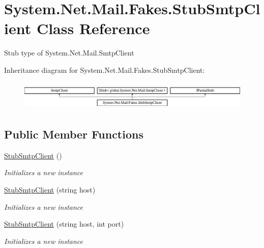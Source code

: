 \hypertarget{class_system_1_1_net_1_1_mail_1_1_fakes_1_1_stub_smtp_client}{\section{System.\-Net.\-Mail.\-Fakes.\-Stub\-Smtp\-Client Class Reference}
\label{class_system_1_1_net_1_1_mail_1_1_fakes_1_1_stub_smtp_client}
}


Stub type of System.\-Net.\-Mail.\-Smtp\-Client 


Inheritance diagram for System.\-Net.\-Mail.\-Fakes.\-Stub\-Smtp\-Client\-:\begin{figure}[H]
\begin{center}
\leavevmode
\includegraphics[height=1.414141cm]{class_system_1_1_net_1_1_mail_1_1_fakes_1_1_stub_smtp_client}
\end{center}
\end{figure}
\subsection*{Public Member Functions}
\begin{DoxyCompactItemize}
\item 
\hyperlink{class_system_1_1_net_1_1_mail_1_1_fakes_1_1_stub_smtp_client_ab43f8d3d3a91cd4d7e2cb9d6e5442d5f}{Stub\-Smtp\-Client} ()
\begin{DoxyCompactList}\small\item\em Initializes a new instance\end{DoxyCompactList}\item 
\hyperlink{class_system_1_1_net_1_1_mail_1_1_fakes_1_1_stub_smtp_client_a39647712ad5599473fa9374e92df0bb5}{Stub\-Smtp\-Client} (string host)
\begin{DoxyCompactList}\small\item\em Initializes a new instance\end{DoxyCompactList}\item 
\hyperlink{class_system_1_1_net_1_1_mail_1_1_fakes_1_1_stub_smtp_client_afbe1d3581ff7073c8b632b1b0ae9bdd2}{Stub\-Smtp\-Client} (string host, int port)
\begin{DoxyCompactList}\small\item\em Initializes a new instance\end{DoxyCompactList}\end{DoxyCompactItemize}
